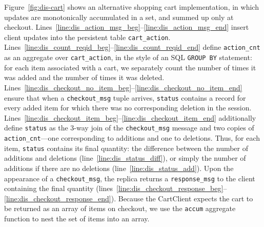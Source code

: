 Figure~\ref{fig:dis-cart} shows an alternative shopping cart implementation, in
which updates are monotonically accumulated in a set, and summed up only at
checkout.  Lines~\ref{line:dis_action_msg_beg}--\ref{line:dis_action_msg_end}
insert client updates into the persistent table \texttt{cart\_action}.
Lines~\ref{line:dis_count_reqid_beg}--\ref{line:dis_count_reqid_end} define
\texttt{action\_cnt} as an aggregate over \texttt{cart\_action}, in the style of
an SQL \texttt{GROUP BY} statement: for each item associated with a cart, we
separately count the number of times it was added and the number of times it was
deleted.
Lines~\ref{line:dis_checkout_no_item_beg}--\ref{line:dis_checkout_no_item_end}
ensure that when a \texttt{checkout\_msg} tuple arrives, \texttt{status}
contains a record for every added item for which there was no corresponding
deletion in the session.
Lines~\ref{line:dis_checkout_item_beg}--\ref{line:dis_checkout_item_end}
additionally define \texttt{status} as the 3-way join of the
\texttt{checkout\_msg} message and two copies of \texttt{action\_cnt}---one
corresponding to additions and one to deletions.  Thus, for each item,
\texttt{status} contains its final quantity: the difference between the number
of additions and deletions (line~\ref{line:dis_status_diff}), or simply the
number of additions if there are no deletions (line~\ref{line:dis_status_add}).
Upon the appearance of a \texttt{checkout\_msg}, the replica returns a
\texttt{response\_msg} to the client containing the final quantity
(lines~\ref{line:dis_checkout_response_beg}--\ref{line:dis_checkout_response_end}).
Because the CartClient expects the cart to be returned as an array of items on
checkout, we use the \texttt{accum} aggregate function to nest the set of
items into an array.


